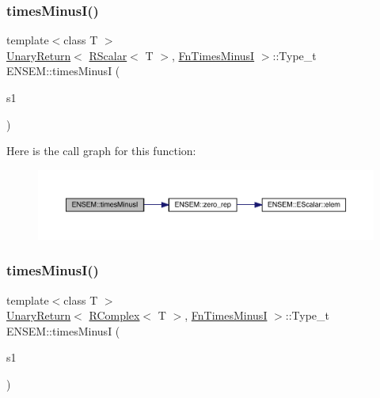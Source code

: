\mbox{\label{group__rcomplex_gaf58bc5b02a5a7fed1251f5ad0f33325a}} 
\subsubsection{\texorpdfstring{timesMinusI()}{timesMinusI()}\hspace{0.1cm}{\footnotesize\ttfamily [1/2]}}
{\footnotesize\ttfamily template$<$class T $>$ \\
\mbox{\hyperlink{structENSEM_1_1UnaryReturn}{Unary\+Return}}$<$ \mbox{\hyperlink{classENSEM_1_1RScalar}{R\+Scalar}}$<$ T $>$, \mbox{\hyperlink{structENSEM_1_1FnTimesMinusI}{Fn\+Times\+MinusI}} $>$\+::Type\+\_\+t E\+N\+S\+E\+M\+::times\+MinusI (\begin{DoxyParamCaption}\item[{const \mbox{\hyperlink{classENSEM_1_1RScalar}{R\+Scalar}}$<$ T $>$ \&}]{s1 }\end{DoxyParamCaption})\hspace{0.3cm}{\ttfamily [inline]}}

Here is the call graph for this function\+:\nopagebreak
\begin{figure}[H]
\begin{center}
\leavevmode
\includegraphics[width=350pt]{da/dc7/group__rcomplex_gaf58bc5b02a5a7fed1251f5ad0f33325a_cgraph}
\end{center}
\end{figure}
\mbox{\label{group__rcomplex_ga630dbd8479e9fe488cbf493531594f06}} 
\subsubsection{\texorpdfstring{timesMinusI()}{timesMinusI()}\hspace{0.1cm}{\footnotesize\ttfamily [2/2]}}
{\footnotesize\ttfamily template$<$class T $>$ \\
\mbox{\hyperlink{structENSEM_1_1UnaryReturn}{Unary\+Return}}$<$ \mbox{\hyperlink{classENSEM_1_1RComplex}{R\+Complex}}$<$ T $>$, \mbox{\hyperlink{structENSEM_1_1FnTimesMinusI}{Fn\+Times\+MinusI}} $>$\+::Type\+\_\+t E\+N\+S\+E\+M\+::times\+MinusI (\begin{DoxyParamCaption}\item[{const \mbox{\hyperlink{classENSEM_1_1RComplex}{R\+Complex}}$<$ T $>$ \&}]{s1 }\end{DoxyParamCaption})\hspace{0.3cm}{\ttfamily [inline]}}

